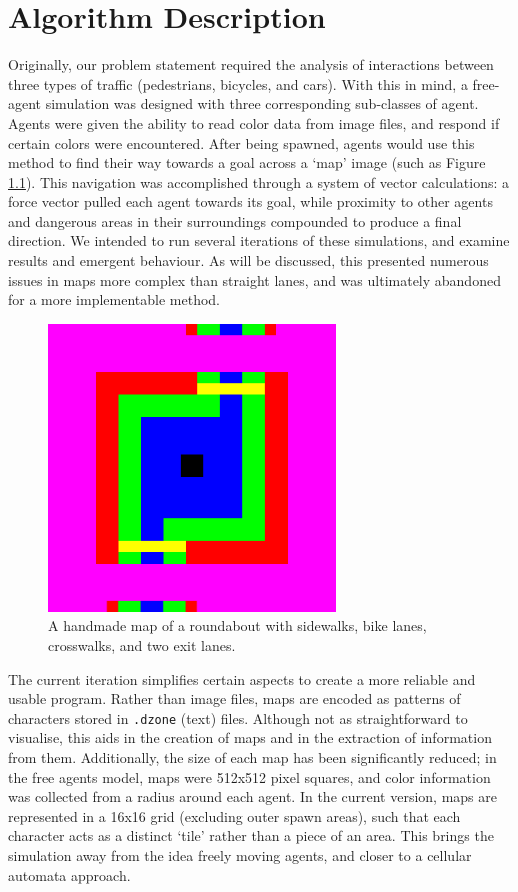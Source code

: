 \chapter{Algorithm Description} \label{chap:algorithm}

Originally, our problem statement required the analysis of interactions between three types of traffic (pedestrians, bicycles, and cars). With this in mind, a free-agent simulation was designed with three corresponding sub-classes of agent. Agents were given the ability to read color data from image files, and respond if certain colors were encountered. After being spawned, agents would use this method to find their way towards a goal across a ‘map’ image (such as Figure \ref{fig:map-roundabout}). This navigation was accomplished through a system of vector calculations: a force vector pulled each agent towards its goal, while proximity to other agents and dangerous areas in their surroundings compounded to produce a final direction. We intended to run several iterations of these simulations, and examine results and emergent behaviour. As will be discussed, this presented numerous issues in maps more complex than straight lanes, and was ultimately abandoned for a more implementable method.

\begin{figure}[h]
    \centering
    \includegraphics[width=3in]{images/map-roundabout.png}
    \caption{A handmade map of a roundabout with sidewalks, bike lanes, crosswalks, and two exit lanes.}
    \label{fig:map-roundabout}
\end{figure}

The current iteration simplifies certain aspects to create a more reliable and usable program. Rather than image files, maps are encoded as patterns of characters stored in \texttt{.dzone} (text) files. Although not as straightforward to visualise, this aids in the creation of maps and in the extraction of information from them. Additionally, the size of each map has been significantly reduced; in the free agents model, maps were 512x512 pixel squares, and color information was collected from a radius around each agent. In the current version, maps are represented in a 16x16 grid (excluding outer spawn areas), such that each character acts as a distinct ‘tile’ rather than a piece of an area. This brings the simulation away from the idea freely moving agents, and closer to a cellular automata approach.

